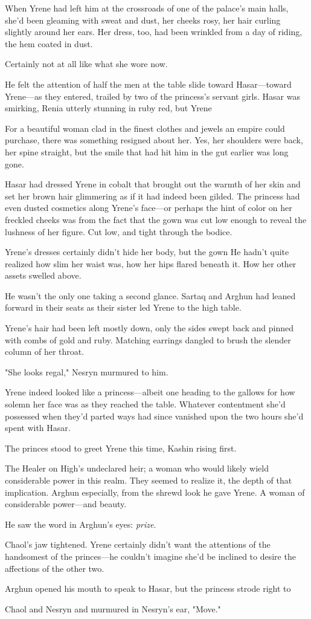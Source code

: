 When Yrene had left him at the crossroads of one of the palace's main halls, she'd been gleaming with sweat and dust, her cheeks rosy, her hair curling slightly around her ears. Her dress, too, had been wrinkled from a day of riding, the hem coated in dust.

Certainly not at all like what she wore now.

He felt the attention of half the men at the table slide toward Hasar---toward Yrene---as they entered, trailed by two of the princess's servant girls. Hasar was smirking, Renia utterly stunning in ruby red, but Yrene 

For a beautiful woman clad in the finest clothes and jewels an empire could purchase, there was something resigned about her. Yes, her shoulders were back, her spine straight, but the smile that had hit him in the gut earlier was long gone.

Hasar had dressed Yrene in cobalt that brought out the warmth of her skin and set her brown hair glimmering as if it had indeed been gilded. The princess had even dusted cosmetics along Yrene's face---or perhaps the hint of color on her freckled cheeks was from the fact that the gown was cut low enough to reveal the lushness of her figure. Cut low, and tight through the bodice.

Yrene's dresses certainly didn't hide her body, but the gown  He hadn't quite realized how slim her waist was, how her hips flared beneath it. How her other assets swelled above.

He wasn't the only one taking a second glance. Sartaq and Arghun had leaned forward in their seats as their sister led Yrene to the high table.

Yrene's hair had been left mostly down, only the sides swept back and pinned with combs of gold and ruby. Matching earrings dangled to brush the slender column of her throat.

"She looks regal," Nesryn murmured to him.

Yrene indeed looked like a princess---albeit one heading to the gallows for how solemn her face was as they reached the table. Whatever contentment she'd possessed when they'd parted ways had since vanished upon the two hours she'd spent with Hasar.

The princes stood to greet Yrene this time, Kashin rising first.

The Healer on High's undeclared heir; a woman who would likely wield considerable power in this realm. They seemed to realize it, the depth of that implication. Arghun especially, from the shrewd look he gave Yrene. A woman of considerable power---and beauty.

He saw the word in Arghun's eyes: \emph{prize}.

Chaol's jaw tightened. Yrene certainly didn't want the attentions of the handsomest of the princes---he couldn't imagine she'd be inclined to desire the affections of the other two.

Arghun opened his mouth to speak to Hasar, but the princess strode right to

Chaol and Nesryn and murmured in Nesryn's ear, "Move."

